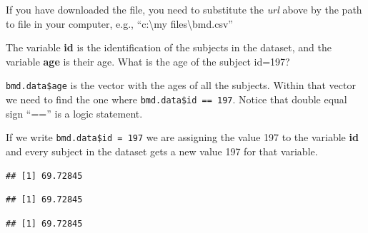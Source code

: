\documentclass[
]{book}
\newenvironment{Shaded}{\begin{snugshade}}{\end{snugshade}}
\newcommand{\CommentTok}[1]{\textcolor[rgb]{0.56,0.35,0.01}{\textit{#1}}}
\newcommand{\DecValTok}[1]{\textcolor[rgb]{0.00,0.00,0.81}{#1}}
\newcommand{\NormalTok}[1]{#1}
\newcommand{\SpecialCharTok}[1]{\textcolor[rgb]{0.81,0.36,0.00}{\textbf{#1}}}
\newcommand{\StringTok}[1]{\textcolor[rgb]{0.31,0.60,0.02}{#1}}
\begin{document}
If you have downloaded the file, you need to substitute the \emph{url} above by
the path to file in your computer, e.g., ``c:\textbackslash my files\textbackslash bmd.csv''

The variable \textbf{id} is the identification of the subjects in the dataset, and
the variable \textbf{age} is their age. What is the age of the subject id=197?

\texttt{bmd.data\$age} is the vector with the ages of all the subjects. Within that
vector we need to find the one where \texttt{bmd.data\$id\ ==\ 197}. Notice that double
equal sign ``=='' is a logic statement.

If we write \texttt{bmd.data\$id\ =\ 197} we are
assigning the value 197 to the variable \textbf{id} and every subject in the dataset
gets a new value 197 for that variable.

\begin{Shaded}
\end{Shaded}

\begin{verbatim}
## [1] 69.72845
\end{verbatim}

\begin{Shaded}
\end{Shaded}

\begin{verbatim}
## [1] 69.72845
\end{verbatim}

\begin{Shaded}
\end{Shaded}

\begin{verbatim}
## [1] 69.72845
\end{verbatim}
\end{document}
